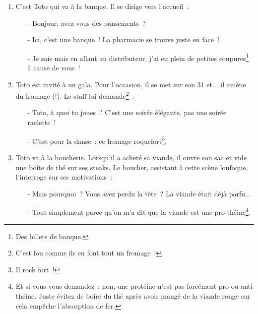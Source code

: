 \documentclass[10pt,a5paper,fullpage]{book}
\begin{document}
\begin{enumerate}
		\item C’est Toto qui va à la banque. Il se dirige vers l’accueil~:
		\begin{itemize}
			\item[-] Bonjour, avez-vous des pansements~?
			\item[-] Ici, c’est une banque~! La pharmacie se trouve juste en face~!
			\item[-] Je sais mais en allant au distributeur, j'ai eu plein de petites coupures\footnote{Des billets de banque.} à cause de vous~!
		\end{itemize}
		
		\item Toto est invité à un gala. Pour l'occasion, il se met sur son 31 et... il amène du fromage (!). Le staff lui demande\footnote{C'est fou comme ils en font tout un fromage~!}~:
		\begin{itemize}
			\item[-] Toto, à quoi tu joues~? C'est une soirée élégante, pas une soirée raclette~!
			\item[-] C'est pour la danse~: ce fromage roquefort\footnote{Il rock fort~!}.
		\end{itemize}
		
		\item Toto va à la boucherie. Lorsqu'il a acheté sa viande, il ouvre son sac et vide une boîte de thé sur ses steaks. Le boucher, assistant à cette scène loufoque, l'interroge sur ses motivations~:
		\begin{itemize}
			\item[-] Mais pourquoi~? Vous avez perdu la tête~? La viande était déjà parfu...
			\item[-] Tout simplement parce qu'on m'a dit que la viande est une pro-théine\footnote{Et si vous vous demandez~: non, une protéine n'est pas forcément pro ou anti théine. Juste évitez de boire du thé après avoir mangé de la viande rouge car cela empêche l'absorption de fer. }. 
		\end{itemize}
	\end{enumerate}
\end{document}
